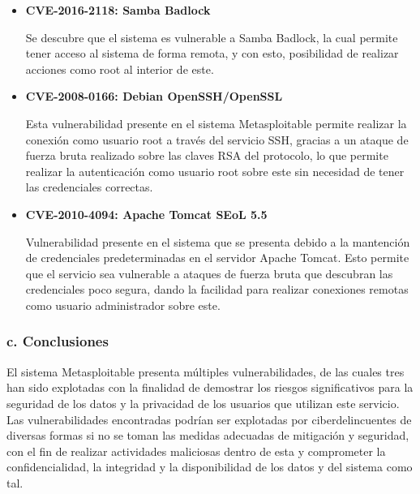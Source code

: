 \documentclass[12pt,oneside,a4paper]{book}
\newcommand{\newsubsection}[1]{{\subsubsection*{#1}
\addcontentsline{toc}{subsection}{#1}}}
\begin{document}
\vspace{2em}

\begin{itemize}
\item \textbf{CVE-2016-2118: Samba Badlock}
	
\vspace{1em}

\hspace{20pt}
Se descubre que el sistema es vulnerable a Samba Badlock, la cual permite tener acceso al sistema de forma remota, y con esto, posibilidad de realizar acciones como root al interior de este.

\vspace{2em}

\item \textbf{CVE-2008-0166: Debian OpenSSH/OpenSSL}

\vspace{1em}

\hspace{20pt}
Esta vulnerabilidad presente en el sistema Metasploitable permite realizar la conexión como usuario root a través del servicio SSH, gracias a un ataque de fuerza bruta realizado sobre las claves RSA del protocolo, lo que permite realizar la autenticación como usuario root sobre este sin necesidad de tener las credenciales correctas.

\vspace{2em}

\item \textbf{CVE-2010-4094: Apache Tomcat SEoL 5.5}

\vspace{1em}

\hspace{20pt}
Vulnerabilidad presente en el sistema que se presenta debido a la mantención de credenciales predeterminadas en el servidor Apache Tomcat. Esto permite que el servicio sea vulnerable a ataques de fuerza bruta que descubran las credenciales poco segura, dando la facilidad para realizar conexiones remotas como usuario administrador sobre este.
\end{itemize}

\vspace{2em}

\newsubsection{c.	Conclusiones}

\vspace{1em}

\hspace{20pt}
El sistema Metasploitable presenta múltiples vulnerabilidades, de las cuales tres han sido explotadas con la finalidad de demostrar los riesgos significativos para la seguridad de los datos y la privacidad de los usuarios que utilizan este servicio. Las vulnerabilidades encontradas podrían ser explotadas por ciberdelincuentes de diversas formas si no se toman las medidas adecuadas de mitigación y seguridad, con el fin de realizar actividades maliciosas dentro de esta y comprometer la confidencialidad, la integridad y la disponibilidad de los datos y del sistema como tal.
\end{document}
